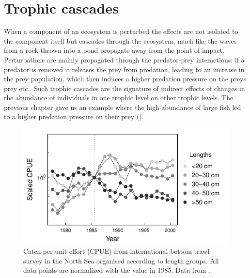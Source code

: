 \section{Trophic cascades}
\label{sec:cascades}
When a component of an ecosystem is perturbed the effects are not isolated to the component itself but cascades through the ecosystem, much like the waves from a rock thrown into a pond propagate away from the point of impact.  Perturbations are mainly propagated through the predator-prey interactions: if a predator is removed it releases the prey from predation, leading to an increase in the prey population, which then induces a higher predation pressure on the preys prey etc..  Such trophic cascades are the signature of indirect effects of changes in the abundance of individuals in one trophic level on other trophic levels. The previous chapter gave us an example where the high abundance of large fish led to a higher predation pressure on their prey  ().  


\begin{figure}[t]
  \centering
  \includegraphics{ChapterCommunityFishing/Daan.pdf}
  \caption{Catch-per-unit-effort (CPUE) from international bottom trawl survey in the North Sea organised according to length groups.  All data-points are normalized with the value in 1985.  Data from \citet{Daan2005}.}
  \label{fig:Daan}
\end{figure}

